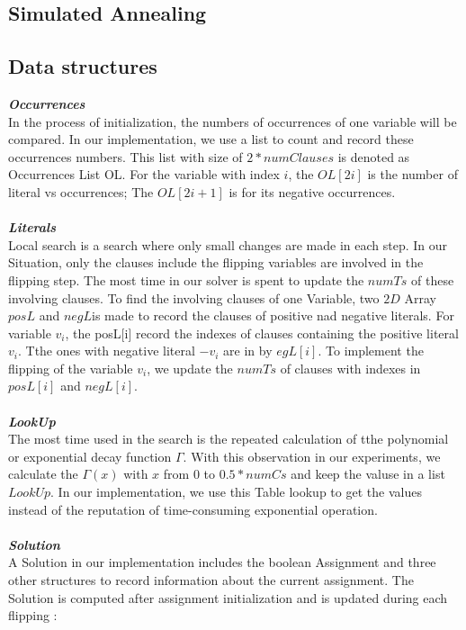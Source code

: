 \documentclass[12pt,a4paper,twoside]{scrartcl}
\numberwithin{equation}{section}
\begin{document}
\subsection{Simulated Annealing}

\label{sec:Simulated Annealing}
\subsection{Data structures}
\label{subsec:Data structures}
\emph{\textbf{ Occurrences}}
\\
In the process of initialization, the numbers of occurrences of one variable will be compared. In our implementation, we use a list to count and record these occurrences numbers. This list with size of $2*numClauses $ is denoted as Occurrences List OL. For the variable with index $i$, the $OL[2i]$ is the number of literal vs occurrences; The $OL[2i+1]$ is for its negative occurrences. \\
\\
\emph{\textbf{ Literals}}
\\
Local search is a search where only small changes are made in each step. In our Situation, only the clauses include the flipping variables are involved in the flipping step. The most time in our solver is spent to update the $numTs$ of these involving clauses. To find the involving clauses of one Variable,  two $2D$ Array $posL$ and $negL$is made to record the clauses of positive nad negative literals. For variable $v_i $, the posL[i] record the indexes of clauses containing the positive literal $v_i$. Tthe ones with negative literal $-v_i$ are in by $egL[i]$. To implement the flipping of the variable $v_i$, we update the $numTs$ of clauses with indexes in $posL[i]$ and $negL[i]$.\\
\\
\emph{\textbf{LookUp}}
\\
The most time used in the search is the repeated  calculation  of  tthe polynomial or exponential decay function $\Gamma$. With this observation in our experiments, we calculate the $\Gamma(x)$ with $x$ from $0$ to $0.5* numCs$ and keep the valuse in a list $LookUp$. In our implementation, we use this Table lookup to get the values instead of the reputation of time-consuming exponential operation.  \\
\\
\emph{\textbf{Solution}}
\\
A Solution in our implementation includes the boolean Assignment and three other structures to record information about the current assignment. The Solution is computed after assignment initialization and is updated during each flipping :\\
\end{document}
